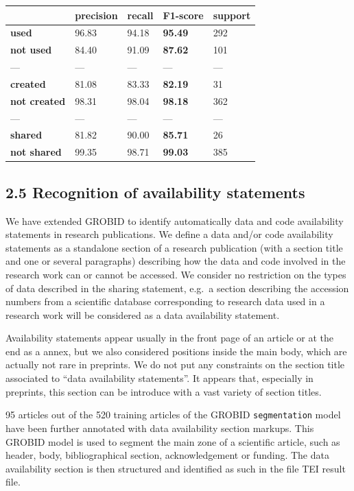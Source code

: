 \documentclass[
]{article}
\begin{document}
\begin{longtable}[]{@{}lllll@{}}
\toprule
& precision & recall & \textbf{F1-score} & support\tabularnewline
\midrule
\endhead
\textbf{used} & 96.83 & 94.18 & \textbf{95.49} & 292\tabularnewline
\textbf{not used} & 84.40 & 91.09 & \textbf{87.62} & 101\tabularnewline
--- & --- & --- & --- & ---\tabularnewline
\textbf{created} & 81.08 & 83.33 & \textbf{82.19} & 31\tabularnewline
\textbf{not created} & 98.31 & 98.04 & \textbf{98.18} &
362\tabularnewline
--- & --- & --- & --- & ---\tabularnewline
\textbf{shared} & 81.82 & 90.00 & \textbf{85.71} & 26\tabularnewline
\textbf{not shared} & 99.35 & 98.71 & \textbf{99.03} &
385\tabularnewline
\bottomrule
\end{longtable}

\hypertarget{recognition-of-availability-statements}{%
\subsection{2.5 Recognition of availability
statements}\label{recognition-of-availability-statements}}

We have extended GROBID to identify automatically data and code
availability statements in research publications. We define a data
and/or code availability statements as a standalone section of a
research publication (with a section title and one or several
paragraphs) describing how the data and code involved in the research
work can or cannot be accessed. We consider no restriction on the types
of data described in the sharing statement, e.g.~a section describing
the accession numbers from a scientific database corresponding to
research data used in a research work will be considered as a data
availability statement.

Availability statements appear usually in the front page of an article
or at the end as a annex, but we also considered positions inside the
main body, which are actually not rare in preprints. We do not put any
constraints on the section title associated to ``data availability
statements''. It appears that, especially in preprints, this section can
be introduce with a vast variety of section titles.

95 articles out of the 520 training articles of the GROBID
\texttt{segmentation} model have been further annotated with data
availability section markups. This GROBID model is used to segment the
main zone of a scientific article, such as header, body, bibliographical
section, acknowledgement or funding. The data availability section is
then structured and identified as such in the file TEI result file.
\end{document}
